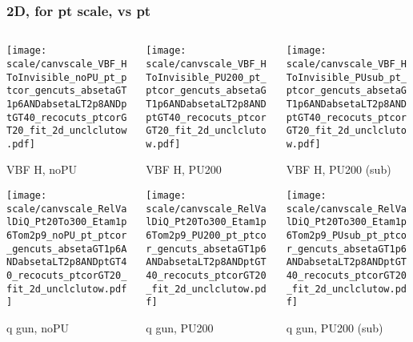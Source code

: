 \documentclass[8pt]{beamer}
\begin{document}
 \begin{frame}
  \frametitle{2D, for pt scale, vs pt}
  
  \begin{columns}
   \begin{column}{0.35\textwidth}
     \texttt{[image: scale/canvscale\_VBF\_HToInvisible\_noPU\_pt\_ptcor\_gencuts\_absetaGT1p6ANDabsetaLT2p8ANDptGT40\_recocuts\_ptcorGT20\_fit\_2d\_unclclutow.pdf]}
     
     VBF H, noPU
    
     \texttt{[image: scale/canvscale\_RelValDiQ\_Pt20To300\_Etam1p6Tom2p9\_noPU\_pt\_ptcor\_gencuts\_absetaGT1p6ANDabsetaLT2p8ANDptGT40\_recocuts\_ptcorGT20\_fit\_2d\_unclclutow.pdf]}
     
     q gun, noPU
   \end{column}
   \begin{column}{0.35\textwidth}
     \texttt{[image: scale/canvscale\_VBF\_HToInvisible\_PU200\_pt\_ptcor\_gencuts\_absetaGT1p6ANDabsetaLT2p8ANDptGT40\_recocuts\_ptcorGT20\_fit\_2d\_unclclutow.pdf]}
     
     VBF H, PU200
    
     \texttt{[image: scale/canvscale\_RelValDiQ\_Pt20To300\_Etam1p6Tom2p9\_PU200\_pt\_ptcor\_gencuts\_absetaGT1p6ANDabsetaLT2p8ANDptGT40\_recocuts\_ptcorGT20\_fit\_2d\_unclclutow.pdf]}
     
     q gun, PU200
   \end{column}
   \begin{column}{0.35\textwidth}
     \texttt{[image: scale/canvscale\_VBF\_HToInvisible\_PUsub\_pt\_ptcor\_gencuts\_absetaGT1p6ANDabsetaLT2p8ANDptGT40\_recocuts\_ptcorGT20\_fit\_2d\_unclclutow.pdf]}
     
     VBF H, PU200 (sub)
    
     \texttt{[image: scale/canvscale\_RelValDiQ\_Pt20To300\_Etam1p6Tom2p9\_PUsub\_pt\_ptcor\_gencuts\_absetaGT1p6ANDabsetaLT2p8ANDptGT40\_recocuts\_ptcorGT20\_fit\_2d\_unclclutow.pdf]}
     
     q gun, PU200 (sub)
   \end{column}
  \end{columns}
 \end{frame}
 
\end{document}
